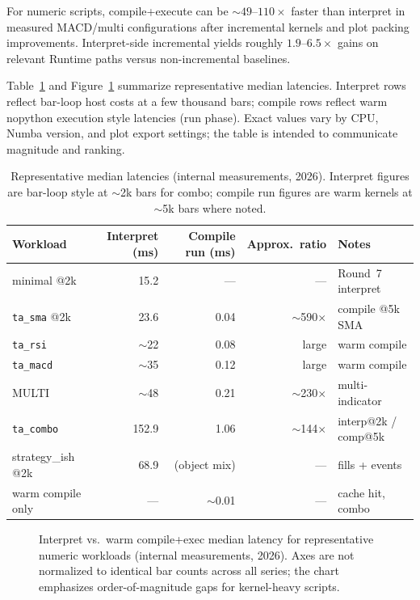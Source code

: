\documentclass[11pt,a4paper]{article}
\begin{document}
For numeric \ta{} scripts, compile+execute can be
$\sim 49$--$110\times$ faster than interpret in measured MACD/multi
configurations after incremental kernels and plot packing improvements.
Interpret-side incremental \ta{} yields roughly $1.9$--$6.5\times$ gains on
relevant Runtime paths versus non-incremental baselines.

Table~\ref{tab:bench} and Figure~\ref{fig:bench} summarize representative
median latencies.
Interpret rows reflect bar-loop host costs at a few thousand bars; compile
rows reflect warm nopython execution style latencies (run phase).
Exact values vary by CPU, Numba version, and plot export settings; the table
is intended to communicate magnitude and ranking.

\begin{table}[t]
\centering
\caption{Representative median latencies (internal measurements, 2026).
Interpret figures are bar-loop style at $\sim$2k bars for combo; compile run
figures are warm kernels at $\sim$5k bars where noted.}
\label{tab:bench}
\begin{tabular}{@{}lrrrl@{}}
\toprule
\textbf{Workload} & \textbf{Interpret (ms)} & \textbf{Compile run (ms)} & \textbf{Approx.\ ratio} & \textbf{Notes} \\
\midrule
minimal @2k & 15.2 & --- & --- & Round~7 interpret \\
\texttt{ta\_sma} @2k & 23.6 & 0.04 & $\sim$590$\times$ & compile @5k SMA \\
\texttt{ta\_rsi} & $\sim$22 & 0.08 & large & warm compile \\
\texttt{ta\_macd} & $\sim$35 & 0.12 & large & warm compile \\
MULTI & $\sim$48 & 0.21 & $\sim$230$\times$ & multi-indicator \\
\texttt{ta\_combo} & 152.9 & 1.06 & $\sim$144$\times$ & interp@2k / comp@5k \\
strategy\_ish @2k & 68.9 & (object mix) & --- & fills + events \\
\midrule
warm compile only & --- & $\sim$0.01 & --- & cache hit, combo \\
\bottomrule
\end{tabular}
\end{table}

\begin{figure}[t]
  \centering
  \resizebox{\textwidth}{!}{}
  \caption{Interpret vs.\ warm compile+exec median latency for representative
  numeric workloads (internal measurements, 2026).
  Axes are not normalized to identical bar counts across all series; the chart
  emphasizes order-of-magnitude gaps for kernel-heavy scripts.}
  \label{fig:bench}
\end{figure}
\end{document}
